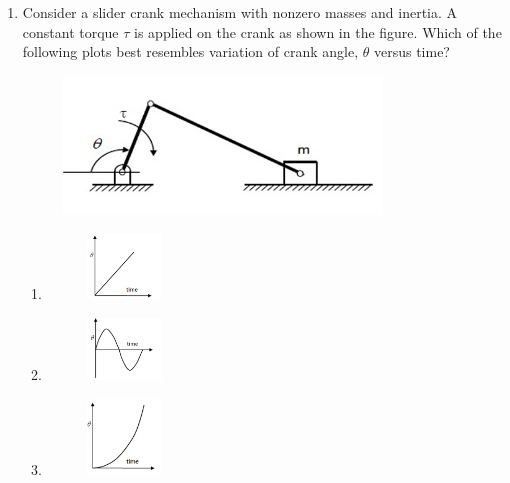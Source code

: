 \documentclass[journal]{IEEEtran}
\begin{document}
\begin{enumerate}
\item Consider a slider crank mechanism with nonzero masses and inertia. A constant torque $\tau$ is applied on the
crank as shown in the figure. Which of the following plots best resembles variation of crank angle, $\theta$ versus time?

\begin{figure}[H]
    \centering
    \includegraphics[width=0.8\textwidth]{Fig 3.png}
    \caption{}
    \label{fig:question24}
\end{figure}

\begin{enumerate}

\item \begin{figure}[H]
    \centering
    \includegraphics[width=0.2\textwidth]{Fig 4.png}
    \caption{}
    \label{fig:question24}
\end{figure}

\item \begin{figure}[H]
    \centering
    \includegraphics[width=0.2\textwidth]{Fig 5.png}
    \caption{}
    \label{fig:question24}
\end{figure}

\item \begin{figure}[H]
    \centering
    \includegraphics[width=0.2\textwidth]{Fig 6.png}
    \caption{}
    \label{fig:question24}
\end{figure}


\end{enumerate}
\end{enumerate}
\end{document}
